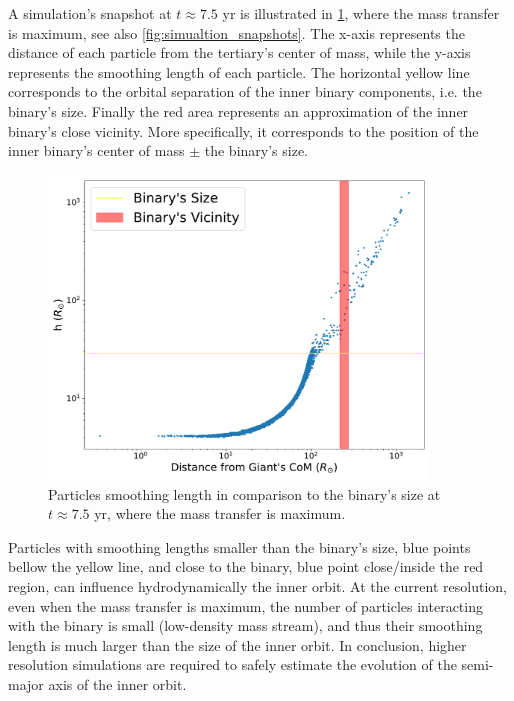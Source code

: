 A simulation's snapshot at $t \approx 7.5$ yr is illustrated in \cref{fig:resolution}, where the mass transfer is maximum, see also \cref{fig:simualtion_snapshots}. The x-axis represents the distance of each particle from the tertiary's center of mass, while the y-axis represents the smoothing length of each particle. The horizontal yellow line corresponds to the orbital separation of the inner binary components, i.e. the binary's size. Finally the red area represents an approximation of the inner binary's close vicinity. More specifically, it corresponds to the position of the inner binary's center of mass $\pm$ the binary's size.
\begin{figure}[!htb]
    \centering
    \includegraphics[width=0.9\textwidth]{Thesis/graphs/resolution_benchmark.pdf}
    \caption{Particles smoothing length in comparison to the binary's size at $t \approx 7.5$ yr, where the mass transfer is maximum.}
    \label{fig:resolution}
\end{figure}
Particles with smoothing lengths smaller than the binary's size, blue points bellow the yellow line, and close to the binary, blue point close/inside the red region, can influence hydrodynamically the inner orbit. At the current resolution, even when the mass transfer is maximum, the number of particles interacting with the binary is small (low-density mass stream), and thus their smoothing length is much larger than the size of the inner orbit. In conclusion, higher resolution simulations are required to safely estimate the evolution of the semi-major axis of the inner orbit.

